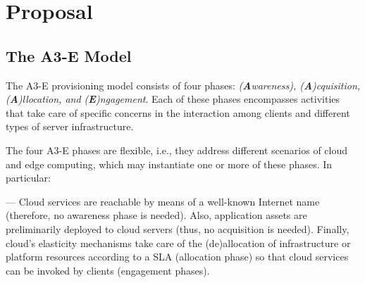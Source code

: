 \section{Proposal}\label{sec:proposal}



\subsection{The A3-E Model}




The A3-E provisioning model consists of four phases: \textit{(\textbf{A}wareness), (\textbf{A})cquisition, (\textbf{A})llocation, and (\textbf{E})ngagement}. Each of these phases encompasses activities that take care of specific concerns in the interaction among clients and different types of server infrastructure. %

The four A3-E phases are flexible, i.e., they address different scenarios of cloud and edge computing, which may instantiate one or more of these phases. In particular:

--- Cloud services are reachable by means of a well-known Internet name (therefore, no awareness phase is needed). Also, application assets are preliminarily deployed to cloud servers (thus, no acquisition is needed). Finally, cloud's elasticity mechanisms take care of the (de)allocation of infrastructure or platform resources according to a SLA (allocation phase) so that cloud services can be invoked by clients (engagement phases). 

